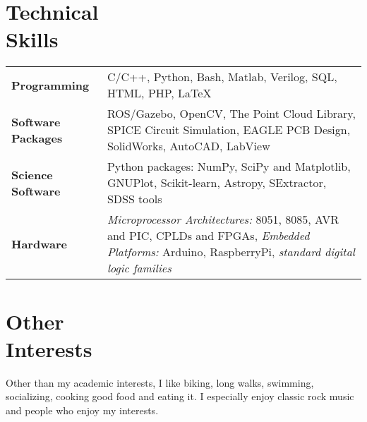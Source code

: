 \documentclass[margin,line]{res}
\begin{document}
\begin{resume}
\section{\sc Technical \\Skills} 
\begin{tabular}{@{}p{1.3in}p{4.3in}}
\textbf{Programming} & C/C++, Python, Bash, Matlab, Verilog, SQL, HTML, PHP, \LaTeX \\  
\vspace*{-0.06in}
\textbf{Software Packages} & 
\vspace*{-0.06in}
ROS/Gazebo, OpenCV, The Point Cloud Library, SPICE Circuit Simulation, EAGLE PCB Design, SolidWorks, AutoCAD, LabView\\ 
\vspace*{-0.06in}
\textbf{Science Software} &
\vspace*{-0.06in}
Python packages: NumPy, SciPy and Matplotlib, GNUPlot, Scikit-learn, Astropy, SExtractor, SDSS tools \\
\vspace*{-0.06in}
\textbf{Hardware} &
\vspace*{-0.06in}
\textit{Microprocessor Architectures:} 8051, 8085, AVR and PIC, CPLDs and FPGAs, \textit{Embedded Platforms:} Arduino, RaspberryPi, \textit{standard digital logic families} \\     
\end{tabular}

\section{\sc Other \\Interests}
Other than my academic interests, I like biking, long walks, swimming, socializing, cooking good food and eating it. I especially enjoy classic rock music and people who enjoy my interests.


\end{resume}
\end{document}
